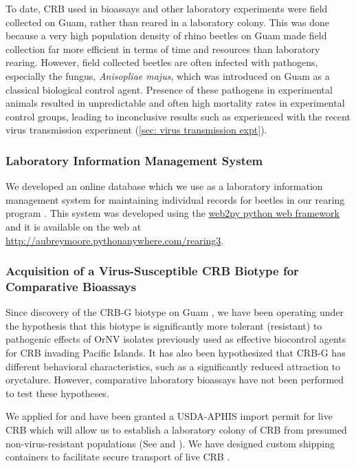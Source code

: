 \documentclass[12pt,letterpaper,english,bibliography=totocnumbered,abstract=on]{scrartcl}
\begin{document}
To date, CRB used in bioassays and other laboratory experiments were field collected on Guam, rather than reared in a laboratory colony. This was done because a very high population density of rhino beetles on Guam made field collection far more efficient in terms of time and resources than laboratory rearing. However, field collected beetles are often infected with pathogens, especially the fungus, \textit{Anisopliae majus}, which was introduced on Guam as a classical biological control agent. Presence of these pathogens in experimental animals resulted in unpredictable and often high mortality rates in experimental control groups, leading to inconclusive results  such as experienced with the recent virus transmission experiment (\ref{sec: virus transmission expt}).

\subsubsection{Laboratory Information Management System}\label{lims}

We developed an online database which we use as a laboratory information management system for maintaining individual records for beetles in our rearing program \parencite{moore_coconut_2019-1}. This system was developed using the \href{http://www.web2py.com/}{web2py python web framework} and it is available on the web at \url{http://aubreymoore.pythonanywhere.com/rearing3}. 

\label{susceptible_biotype}
\subsubsection{Acquisition of a Virus-Susceptible CRB Biotype for Comparative Bioassays}

Since discovery of the CRB-G biotype on Guam \parencite{marshall_new_2017-1}, we have been operating under the hypothesis that this biotype is significantly more tolerant (resistant) to pathogenic effects of OrNV isolates previously used as effective biocontrol agents for CRB invading Pacific Islands. It has also been hypothesized that CRB-G has different behavioral characteristics, such as a significantly reduced attraction to oryctalure. However, comparative laboratory bioassays have not been performed to test these hypotheses.

We applied for and have been granted a USDA-APHIS import permit for live CRB which will allow us to establish a laboratory colony of CRB from presumed non-virus-resistant populations (See \parencite{moore_additional_2019} and \parencite{usda-aphis_crb_2019}). We have designed custom shipping containers to facilitate secure transport of live CRB \parencite{moore_container_2017-1}.
\end{document}
